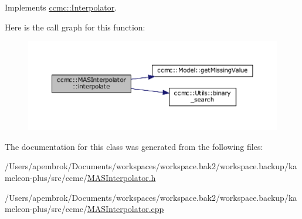 Implements \hyperlink{classccmc_1_1_interpolator_aa6b272bd53630020d92938ec1e5cfad9}{ccmc\-::\-Interpolator}.



Here is the call graph for this function\-:\nopagebreak
\begin{figure}[H]
\begin{center}
\leavevmode
\includegraphics[width=350pt]{classccmc_1_1_m_a_s_interpolator_ab4015bfd559e1eac116ef1772be91b03_cgraph}
\end{center}
\end{figure}




The documentation for this class was generated from the following files\-:\begin{DoxyCompactItemize}
\item 
/\-Users/apembrok/\-Documents/workspaces/workspace.\-bak2/workspace.\-backup/kameleon-\/plus/src/ccmc/\hyperlink{_m_a_s_interpolator_8h}{M\-A\-S\-Interpolator.\-h}\item 
/\-Users/apembrok/\-Documents/workspaces/workspace.\-bak2/workspace.\-backup/kameleon-\/plus/src/ccmc/\hyperlink{_m_a_s_interpolator_8cpp}{M\-A\-S\-Interpolator.\-cpp}\end{DoxyCompactItemize}
